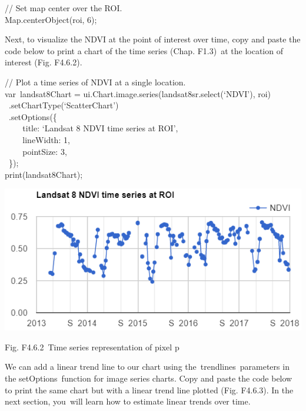 \documentclass[
  letterpaper,
  DIV=11,
  numbers=noendperiod]{scrreprt}
\begin{document}
// Set map center over the ROI.\\
Map.centerObject(roi, 6);

Next, to visualize the NDVI at the point of interest over time, copy and
paste the code below to print a chart of the time series (Chap. F1.3)~at
the location of interest (Fig. F4.6.2).

// Plot a time series of NDVI at a single location.\\
var~landsat8Chart = ui.Chart.image.series(landsat8sr.select(`NDVI'),
roi)\\
\hspace*{0.333em} ~.setChartType(`ScatterChart')\\
\hspace*{0.333em} ~.setOptions(\{\\
\hspace*{0.333em} ~ ~ ~title: `Landsat 8 NDVI time series at ROI',\\
\hspace*{0.333em} ~ ~ ~lineWidth: 1,\\
\hspace*{0.333em} ~ ~ ~pointSize: 3,\\
\hspace*{0.333em} ~\});\\
print(landsat8Chart);

\includegraphics{./F4/image3.png}

Fig. F4.6.2~Time series representation of pixel p~

We can add a linear trend line to our chart using
the~trendlines~parameters in the setOptions~function for image series
charts. Copy and paste the code below to print the same chart but with a
linear trend line plotted (Fig. F4.6.3). In the next section, you~will
learn how to estimate linear trends over time.
\end{document}
